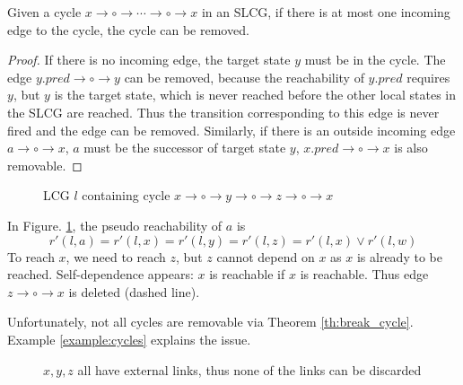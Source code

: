 \documentclass{entcs}
\begin{document}
\begin{theorem}\label{th:break_cycle}
Given a cycle $x\to \circ \to \cdots \to \circ \to x$ in an SLCG, if there is at most one incoming edge to the cycle, the cycle can be removed.
\end{theorem}
\begin{proof}
If there is no incoming edge, the target state $y$ must be in the cycle. 
The edge $y.pred\to\circ\to y$ can be removed, because the reachability of $y.pred$ requires $y$, but $y$ is the target state, which is never reached before the other local states in the SLCG are reached.
Thus the transition corresponding to this edge is never fired and the edge can be removed.
Similarly, if there is an outside incoming edge $a\to \circ \to x$, $a$ must be the successor of target state $y$, $x.pred\to\circ\to x$ is also removable.
\end{proof}
\begin{example}
    \begin{figure}[ht]
        \centering
        
        \caption{LCG $l$ containing cycle $x\to \circ \to y \to \circ \to z\to \circ \to x$}
        \label{cycle1}
    \end{figure}
    
    In Figure. \ref{cycle1}, the pseudo reachability of $a$ is 
    $$r'(l,a)=r'(l,x)=r'(l,y)=r'(l,z)=r'(l,x)\lor r'(l,w)$$
    To reach $x$, we need to reach $z$, but $z$ cannot depend on $x$ as $x$ is already to be reached. 
    Self-dependence appears: $x$ is reachable if $x$ is reachable.
    Thus edge $z\to \circ \to x$ is deleted (dashed line).
\end{example}
Unfortunately, not all cycles are removable via Theorem \ref{th:break_cycle}. Example \ref{example:cycles} explains the issue.
\begin{example}\label{example:cycles}
    \begin{figure}[ht]
        \centering
        
        \caption{$x,y,z$ all have external links, thus none of the links can be discarded}
        \label{cycle3}
    \end{figure}
\end{example}
\end{document}
